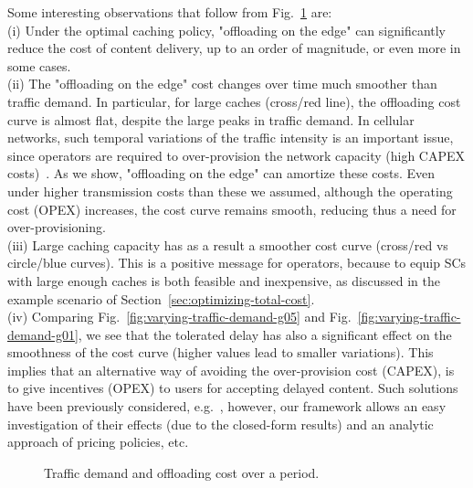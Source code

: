 \documentclass[10pt,conference,letterpaper]{IEEEtran}
\begin{document}
\noindent Some interesting observations that follow from Fig.~\ref{fig:varying-traffic-demand} are: \\
(i) Under the optimal caching policy, "offloading on the edge" can significantly reduce the cost of content delivery, up to an order of magnitude, or even more in some cases. \\
(ii) The "offloading on the edge" cost changes over time much smoother than traffic demand. In particular, for large caches (cross/red line), the offloading cost curve is almost flat, despite the large peaks in traffic demand. In cellular networks, such temporal variations of the traffic intensity is an important issue, since operators are required to over-provision the network capacity (high CAPEX costs)~\cite{tube}. As we show, "offloading on the edge" can amortize these costs. Even under higher transmission costs  than these we assumed, although the operating cost (OPEX) increases, the cost curve remains smooth, reducing thus a need for over-provisioning. \\
(iii) Large caching capacity has as a result a smoother cost curve (cross/red vs circle/blue curves). This is a positive message for operators, because to equip SCs with large enough caches is both feasible and inexpensive, as discussed in the example scenario of Section~\ref{sec:optimizing-total-cost}. \\
(iv) Comparing Fig.~\ref{fig:varying-traffic-demand-g05} and Fig.~\ref{fig:varying-traffic-demand-g01}, we see that the tolerated delay has also a significant effect on the smoothness of the cost curve (higher  values lead to smaller variations). This implies that an alternative way of avoiding the over-provision cost (CAPEX), is to give incentives (OPEX) to users for accepting delayed content. Such solutions have been previously considered, e.g.~\cite{tube}, however, our framework allows an easy investigation of their effects (due to the closed-form results) and an analytic approach of pricing policies, etc.


\begin{figure}
\caption{Traffic demand and offloading cost over a  period.}\label{fig:varying-traffic-demand}
\end{figure}
\end{document}
